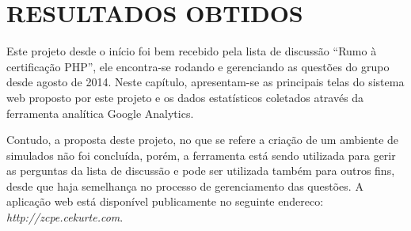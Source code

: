\chapter{RESULTADOS OBTIDOS}
\label{chp:resultadosObtidos}

Este projeto desde o início foi bem recebido pela lista de discussão ``Rumo à
certificação PHP'', ele encontra-se rodando e gerenciando as questões do grupo
desde agosto de 2014. Neste capítulo, apresentam-se as principais telas do
sistema web proposto por este projeto e os dados estatísticos coletados através da
ferramenta analítica \acs{Google Analytics}.




Contudo, a proposta deste projeto, no que se refere a criação de um ambiente de
simulados não foi concluída, porém, a ferramenta está sendo utilizada para gerir
as perguntas da lista de discussão e pode ser utilizada também para outros fins,
desde que haja semelhança no processo de gerenciamento das questões. A aplicação
web está disponível publicamente no seguinte endereco: \textit{http://zcpe.cekurte.com}.